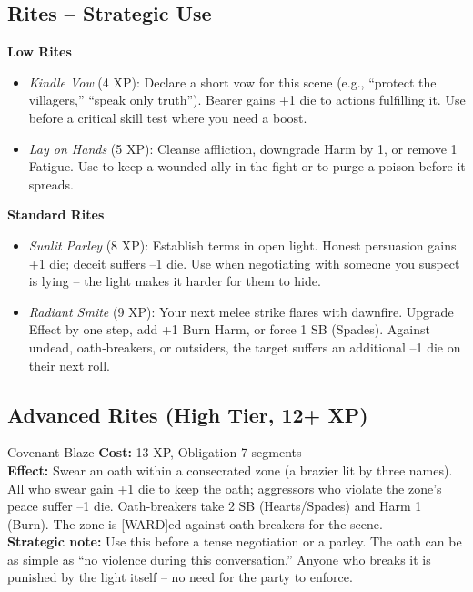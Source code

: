 \documentclass[10pt,a5paper]{book}
\begin{document}
\subsection*{Rites – Strategic Use}

\textbf{Low Rites}
\begin{itemize}
    \item \textit{Kindle Vow} (4 XP): Declare a short vow for this scene (e.g., “protect the villagers,” “speak only truth”). Bearer gains +1 die to actions fulfilling it. Use before a critical skill test where you need a boost.
    \item \textit{Lay on Hands} (5 XP): Cleanse affliction, downgrade Harm by 1, or remove 1 Fatigue. Use to keep a wounded ally in the fight or to purge a poison before it spreads.
\end{itemize}

\textbf{Standard Rites}
\begin{itemize}
    \item \textit{Sunlit Parley} (8 XP): Establish terms in open light. Honest persuasion gains +1 die; deceit suffers –1 die. Use when negotiating with someone you suspect is lying – the light makes it harder for them to hide.
    \item \textit{Radiant Smite} (9 XP): Your next melee strike flares with dawnfire. Upgrade Effect by one step, add +1 Burn Harm, or force 1 SB (Spades). Against undead, oath‑breakers, or outsiders, the target suffers an additional –1 die on their next roll.
\end{itemize}

\subsection*{Advanced Rites (High Tier, 12+ XP)}

\begin{patronbox}{Covenant Blaze}
\textbf{Cost:} 13 XP, Obligation 7 segments \\
\textbf{Effect:} Swear an oath within a consecrated zone (a brazier lit by three names). All who swear gain +1 die to keep the oath; aggressors who violate the zone’s peace suffer –1 die. Oath‑breakers take 2 SB (Hearts/Spades) and Harm 1 (Burn). The zone is [WARD]ed against oath‑breakers for the scene. \\
\textbf{Strategic note:} Use this before a tense negotiation or a parley. The oath can be as simple as “no violence during this conversation.” Anyone who breaks it is punished by the light itself – no need for the party to enforce.
\end{patronbox}
\end{document}
